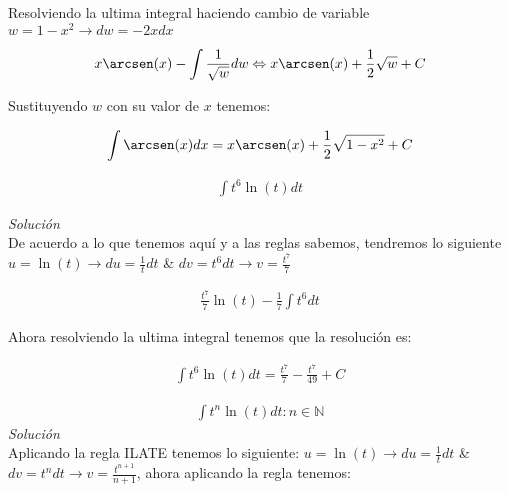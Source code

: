 Resolviendo la ultima integral haciendo cambio de variable \(\displaystyle w=1-x^{2} \rightarrow dw=-2x dx\)

\begin{equation*}
    \begin{gathered}
        x\arcsen(x)-\int \frac{1}{\sqrt{w}}dw \Leftrightarrow x\arcsen(x)+\frac{1}{2}\sqrt{w} + C
    \end{gathered}
\end{equation*}

Sustituyendo \(\displaystyle w\) con su valor de \(\displaystyle x\) tenemos:

\begin{equation*}
    \begin{gathered}
        \int \arcsen(x)dx=x\arcsen(x)+\frac{1}{2}\sqrt{1-x^{2}}+C
    \end{gathered}
\end{equation*}

\vspace{1cm}
\begin{equation}
    \begin{gathered}
        \int t^{6}\ln(t)dt
    \end{gathered}
\end{equation}

\textit{Solución}\\

De acuerdo a lo que tenemos aquí y a las reglas sabemos, tendremos lo siguiente \(\displaystyle u=\ln(t) \rightarrow du=\frac{1}{t}dt\) \& \(\displaystyle dv=t^{6}dt \rightarrow v=\frac{t^7}{7}\)

\begin{equation*}
    \begin{gathered}
        \frac{t^7}{7}\ln(t)-\frac{1}{7}\int t^{6}dt
    \end{gathered}
\end{equation*}

Ahora resolviendo la ultima integral tenemos que la resolución es:

\begin{equation*}
    \begin{gathered}
        \int t^{6}\ln(t)dt = \frac{t^{7}}{7}-\frac{t^{7}}{49} + C
    \end{gathered}
\end{equation*}

\vspace{1cm}
\begin{equation}
    \begin{gathered}
        \int t^{n}\ln(t)dt \colon n \in \mathbb{N}
    \end{gathered}
\end{equation}
\textit{Solución}\\
Aplicando la regla ILATE tenemos lo siguiente: \(\displaystyle u=\ln(t)\rightarrow du=\frac{1}{t}dt\) \& \(\displaystyle dv=t^{n}dt \rightarrow v=\frac{t^{n+1}}{n+1}\), ahora aplicando la regla tenemos:

